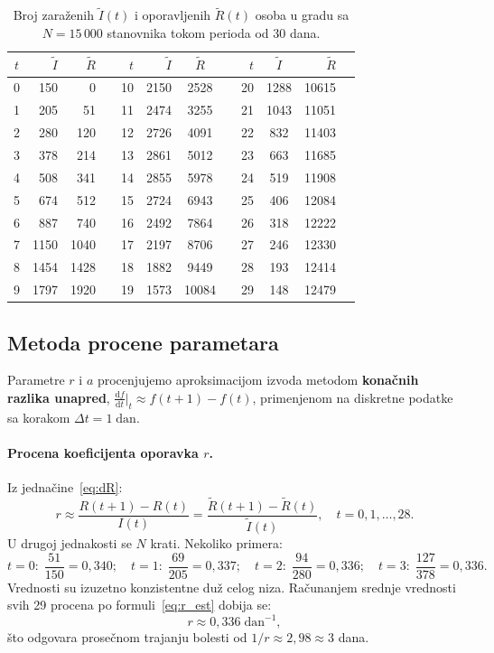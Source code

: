 \documentclass[12pt,a4paper]{article}
\begin{document}
	\begin{table}[H]
		\centering
		\caption{Broj zaraženih $\tilde{I}(t)$ i oporavljenih $\tilde{R}(t)$ osoba u gradu sa $N=15\,000$ stanovnika tokom perioda od 30 dana.}
		\label{tab:podaci}
		\small
		\setlength{\tabcolsep}{5pt}
		\begin{tabular}{crrcrrcrrcrr}
			\toprule
			$t$ & $\tilde{I}$ & $\tilde{R}$ && $t$ & $\tilde{I}$ & $\tilde{R}$ && $t$ & $\tilde{I}$ & $\tilde{R}$ \\
			\midrule
			0  & 150  & 0     && 10 & 2150 & 2528  && 20 & 1288 & 10615 \\
			1  & 205  & 51    && 11 & 2474 & 3255  && 21 & 1043 & 11051 \\
			2  & 280  & 120   && 12 & 2726 & 4091  && 22 & 832  & 11403 \\
			3  & 378  & 214   && 13 & 2861 & 5012  && 23 & 663  & 11685 \\
			4  & 508  & 341   && 14 & 2855 & 5978  && 24 & 519  & 11908 \\
			5  & 674  & 512   && 15 & 2724 & 6943  && 25 & 406  & 12084 \\
			6  & 887  & 740   && 16 & 2492 & 7864  && 26 & 318  & 12222 \\
			7  & 1150 & 1040  && 17 & 2197 & 8706  && 27 & 246  & 12330 \\
			8  & 1454 & 1428  && 18 & 1882 & 9449  && 28 & 193  & 12414 \\
			9  & 1797 & 1920  && 19 & 1573 & 10084 && 29 & 148  & 12479 \\
			\bottomrule
		\end{tabular}
	\end{table}
	
	\subsection{Metoda procene parametara}
	
	Parametre $r$ i $a$ procenjujemo aproksimacijom izvoda metodom \textbf{konačnih razlika unapred}, $\frac{\mathrm{d}f}{\mathrm{d}t}\big|_{t} \approx f(t+1)-f(t)$,
	primenjenom na diskretne podatke sa korakom $\Delta t = 1\;\mathrm{dan}$.
	
	\paragraph{Procena koeficijenta oporavka $r$.}
	Iz jednačine~\eqref{eq:dR}:
	\begin{equation}
		r \approx \frac{R(t+1)-R(t)}{I(t)} = \frac{\tilde{R}(t+1)-\tilde{R}(t)}{\tilde{I}(t)},
		\quad t = 0,1,\ldots,28.
		\label{eq:r_est}
	\end{equation}
	U drugoj jednakosti se $N$ krati. Nekoliko primera:
	\[
	t=0:\;\frac{51}{150}=0{,}340;\quad
	t=1:\;\frac{69}{205}=0{,}337;\quad
	t=2:\;\frac{94}{280}=0{,}336;\quad
	t=3:\;\frac{127}{378}=0{,}336.
	\]
	Vrednosti su izuzetno konzistentne duž celog niza. Računanjem srednje vrednosti svih 29 procena po 
	formuli~\eqref{eq:r_est} dobija se:
	\begin{equation}
		\boxed{r \approx 0{,}336\;\mathrm{dan}^{-1},}
		\label{eq:r_val}
	\end{equation}
	što odgovara prosečnom trajanju bolesti od $1/r \approx 2{,}98 \approx 3$ dana.
	
\end{document}

